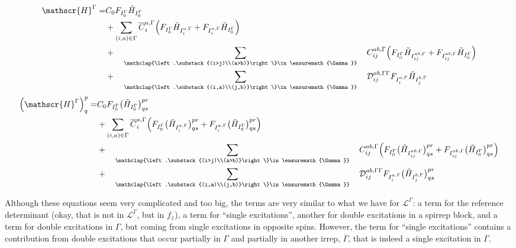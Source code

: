 \documentclass[a4paper,11pt]{article}
\newcommand{\Dmix}{\ensuremath{\mathcal{D}}}
\newcommand{\bigH}{\ensuremath{{\mathscr{H}}}}
\newcommand{\irp}{\ensuremath{\Gamma}}
\newcommand{\irpB}{{\ensuremath{\overline{\Gamma}}}}
\newcommand{\sumijabrestr}{\ensuremath{
    \quad\sum_{\mathclap{\left.\substack{(i>j)\\(a>b)}\right\}\in\irp}}\quad}}
\newcommand{\sumijabfull}{\ensuremath{
    \quad\sum_{\mathclap{\left.\substack{(i,a)\\(j,b)}\right\}\in\irp}}\quad}}
\begin{document}
\begin{equation}
  \begin{split}
    \bigH^\irp = &
    C_0 F_{I_0^\irp} \tilde{H}_{I_0^\irp}\\
    & + \sum_{(i,a) \in \irp} \overline{C}_i^{a,\irp}
    \Big(
        F_{I_0^\irp} \tilde{H}_{I_{i}^{a,\irp}}
        + F_{I_{i}^{a,\irp}} \tilde{H}_{I_0^\irp}
    \Big)\\
    & + \sumijabrestr C_{ij}^{ab, \irp}
    \Big(
        F_{I_0^\irp} \tilde{H}_{I_{ij}^{ab,\irp}}
        + F_{I_{ij}^{ab,\irp}} \tilde{H}_{I_0^\irp}
    \Big)\\
    & + \sumijabfull \Dmix_{ij}^{ab, \irp\irp}
    F_{I_i^{a,\irp}} \tilde{H}_{I_j^{b,\irp}}
  \end{split}
\end{equation}
\begin{equation}
  \begin{split}
    \Big( \bigH^\irp \Big)^p_q = &
    C_0 F_{I_0^\irp} \big( \tilde{H}_{I_0^\irp} \big)^{pr}_{qs}\\
    & + \sum_{(i,a) \in \irp} \overline{C}_i^{a,\irp}
    \Big(
        F_{I_0^\irp} \big( \tilde{H}_{I_{i}^{a,\irp}} \big)^{pr}_{qs}
        + F_{I_{i}^{a,\irp}} \big( \tilde{H}_{I_0^\irp} \big)^{pr}_{qs}
    \Big)\\
    & + \sumijabrestr C_{ij}^{ab, \irp}
    \Big(
        F_{I_0^\irp} \big( \tilde{H}_{I_{ij}^{ab,\irp}} \big)^{pr}_{qs}
        + F_{I_{ij}^{ab,\irp}} \big( \tilde{H}_{I_0^\irp} \big)^{pr}_{qs}
    \Big)\\
    & + \sumijabfull \Dmix_{ij}^{ab, \irp\irp}
    F_{I_i^{a,\irp}} \big( \tilde{H}_{I_j^{b,\irp}} \big)^{pr}_{qs}
  \end{split}
\end{equation}

Although these equations seem very complicated and too big, the terms are very similar to what we have for $\mathcal{L}^\irp$:
a term for the reference determinant (okay, that is not in $\mathcal{L}^\irp$, but in $f_\lozenge$), a term for ``single excitations'', another for double excitations in a spirrep block, and a term for double excitations in $\irp$, but coming from single excitations in opposite spins.
However, the term for ``single excitations'' contains a contribution from double excitations that occur partially in $\irp$ and partially in another irrep, $\irpB$, that is indeed a single excitation in $\irp$.
\end{document}
